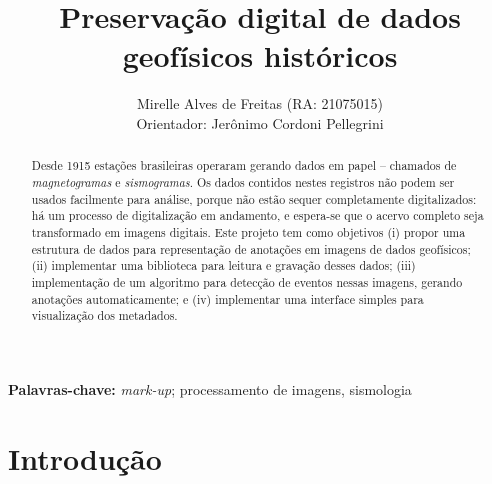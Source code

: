 \documentclass{article}
\title{Preservação digital de dados geofísicos históricos}
\author{Mirelle Alves de Freitas (RA: 21075015)\\
  Orientador: Jerônimo Cordoni Pellegrini}
\begin{document}
\maketitle

\begin{abstract}
  Desde 1915 estações brasileiras operaram gerando dados
  em papel -- chamados de {\em magnetogramas} e {\em sismogramas}. Os
  dados contidos nestes registros não podem ser usados facilmente para
  análise, porque não estão sequer completamente digitalizados: há um
  processo de 
  digitalização em andamento, e espera-se que o acervo completo seja
  transformado em imagens digitais.
  Este projeto tem como objetivos (i) propor uma estrutura de dados para
  representação de anotações em imagens de dados geofísicos; (ii)
  implementar uma biblioteca para leitura e gravação desses dados;
  (iii) implementação de um algoritmo para detecção de eventos nessas
  imagens, gerando anotações automaticamente; e (iv)  implementar uma
  interface simples para visualização dos metadados.
\end{abstract}


\begin{center}
  \begin{minipage}{10cm}
    \begin{center}
      \textbf{Palavras-chave:} {\em mark-up}; processamento de
      imagens, sismologia
    \end{center}
  \end{minipage}
\end{center}

\section{Introdução}
\end{document}
